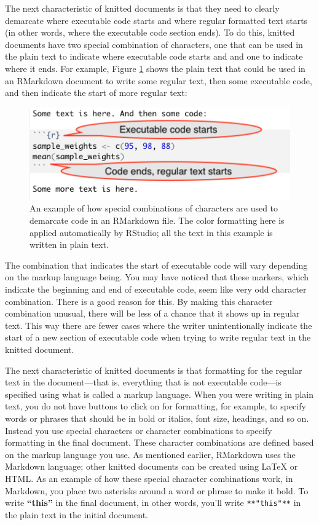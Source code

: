 \documentclass[]{tufte-book}
\begin{document}
The next characteristic of knitted documents is that they need to clearly
demarcate where executable code starts and where regular formatted text starts
(in other words, where the executable code section ends). To do this, knitted
documents have two special combination of characters, one that can be used in
the plain text to indicate where executable code starts and and one to indicate
where it ends. For example, Figure \ref{fig:demarcatecode} shows the plain text
that could be used in an RMarkdown document to write some regular text, then
some executable code, and then indicate the start of more regular text:

\begin{figure}
\includegraphics[width=\textwidth]{figures/demarcating_code} \caption[An example of how special combinations of characters are used to demarcate code in an RMarkdown file]{An example of how special combinations of characters are used to demarcate code in an RMarkdown file. The color formatting here is applied automatically by RStudio; all the text in this example is written in plain text.}\label{fig:demarcatecode}
\end{figure}

The combination that indicates the start of executable code will vary depending
on the markup language being.
You may have noticed that these markers, which indicate the beginning and end of
executable code, seem like very odd character combination. There is a good
reason for this. By making this character combination unusual, there will be
less of a chance that it shows up in regular text. This way there are fewer
cases where the writer unintentionally indicate the start of a new section of
executable code when trying to write regular text in the knitted document.

The next characteristic of knitted documents is that formatting for the regular
text in the document---that is, everything that is not executable code---is
specified using what is called a markup language. When you were writing in
plain text, you do not have buttons to click on for formatting, for example, to
specify words or phrases that should be in bold or italics, font size, headings,
and so on. Instead you use special characters or character combinations to
specify formatting in the final document. These character combinations are
defined based on the markup language you use. As mentioned earlier, RMarkdown
uses the Markdown language; other knitted documents can be created using LaTeX
or HTML. As an example of how these special character combinations work, in
Markdown, you place two asterisks around a word or phrase to make it bold. To
write \textbf{``this''} in the final document, in other words, you'll write
\texttt{**"this"**} in the plain text in the initial document.
\end{document}
